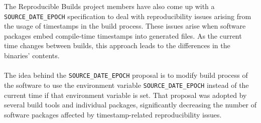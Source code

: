 {The Reproducible Builds project members have also come up with a \texttt{SOURCE\_DATE\_EPOCH} specification \autocite{SDEspec} to deal with reproducibility issues arising from the usage of timestamps in the build process.
These issues arise when software packages embed compile-time timestamps into generated files. As the current time changes between builds, this approach leads to the differences in the binaries' contents. \\\\
The idea behind the \texttt{SOURCE\_DATE\_EPOCH} proposal is to modify build process of the software to use the environment variable \texttt{SOURCE\_DATE\_EPOCH} instead of the current time if that environment variable is set. 
That proposal was adopted by several build tools and individual packages\autocite{SDEproposal}, significantly decreasing the number of software packages affected by timestamp-related reproducibility issues.\\


}





